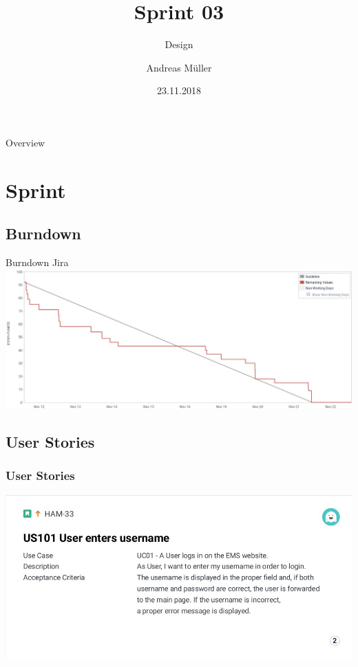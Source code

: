 \documentclass[aspectratio=1610,20pt,utf8]{beamer}
\title[Team Hams]{Sprint 03}
\subtitle{Design}
\author[\today]{Andreas M\"uller}
\institute[Team Hams]
{
  Team Hams\\
  Leading Product Owner and Scrum Master\\
}
\date{23.11.2018}
\begin{document}
\begin{frame}[plain]
  \titlepage
\end{frame}

\begin{frame}{Overview}
\tableofcontents
\end{frame}

\section{Sprint} 

\subsection{Burndown}
\begin{frame}{Burndown Jira}
	\centering
	\includegraphics[width=15cm]{img/s03_hams_jira_burndown.jpg}
\end{frame}

\subsection{User Stories}
\begin{frame}
	\frametitle{User Stories}
	\begin{minipage}{15cm}
		\includegraphics[width=15cm]{img/user_story_101.jpg}
		\centering
	\end{minipage}%
\end{frame}
\end{document}
